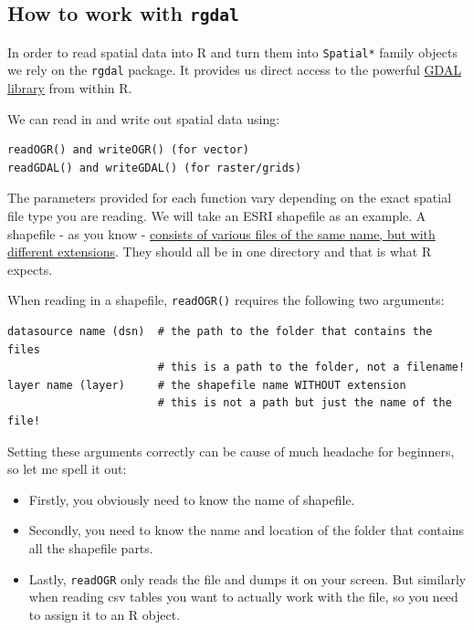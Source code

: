 \documentclass[]{book}
\theoremstyle{definition}
\theoremstyle{definition}
\theoremstyle{definition}
\theoremstyle{remark}
\begin{document}
\subsection{\texorpdfstring{How to work with
\texttt{rgdal}}{How to work with rgdal}}\label{how-to-work-with-rgdal}

In order to read spatial data into R and turn them into
\texttt{Spatial*} family objects we rely on the \texttt{rgdal} package.
It provides us direct access to the powerful \href{http://gdal.org}{GDAL
library} from within R.

We can read in and write out spatial data using:

\begin{verbatim}
readOGR() and writeOGR() (for vector)  
readGDAL() and writeGDAL() (for raster/grids)
\end{verbatim}

The parameters provided for each function vary depending on the exact
spatial file type you are reading. We will take an ESRI shapefile as an
example. A shapefile - as you know -
\href{https://en.wikipedia.org/wiki/Shapefile}{consists of various files
of the same name, but with different extensions}. They should all be in
one directory and that is what R expects.

When reading in a shapefile, \texttt{readOGR()} requires the following
two arguments:

\begin{verbatim}
datasource name (dsn)  # the path to the folder that contains the files
                       # this is a path to the folder, not a filename!
layer name (layer)     # the shapefile name WITHOUT extension
                       # this is not a path but just the name of the file!
\end{verbatim}

Setting these arguments correctly can be cause of much headache for
beginners, so let me spell it out:

\begin{itemize}
\item
  Firstly, you obviously need to know the name of shapefile.
\item
  Secondly, you need to know the name and location of the folder that
  contains all the shapefile parts.
\item
  Lastly, \texttt{readOGR} only reads the file and dumps it on your
  screen. But similarly when reading csv tables you want to actually
  work with the file, so you need to assign it to an R object.
\end{itemize}
\end{document}
